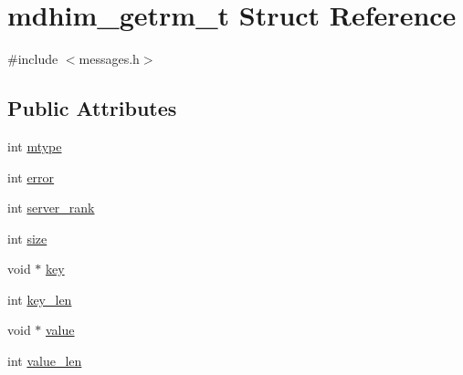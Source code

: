 \hypertarget{structmdhim__getrm__t}{\section{mdhim\-\_\-getrm\-\_\-t Struct Reference}
\label{structmdhim__getrm__t}
}


{\ttfamily \#include $<$messages.\-h$>$}

\subsection*{Public Attributes}
\begin{DoxyCompactItemize}
\item 
int \hyperlink{structmdhim__getrm__t_af7c9cb5700c74dae330d00dcb53306a8}{mtype}
\item 
int \hyperlink{structmdhim__getrm__t_ab5a0bbbc5c249097b7ea3c71a8c59be9}{error}
\item 
int \hyperlink{structmdhim__getrm__t_ab7e6c3fdb4ba044166a37bf1e178b334}{server\-\_\-rank}
\item 
int \hyperlink{structmdhim__getrm__t_a850957632986ef7c1f352de7e126d6a4}{size}
\item 
void $\ast$ \hyperlink{structmdhim__getrm__t_a03ac590954131b0bd04b767115b011d2}{key}
\item 
int \hyperlink{structmdhim__getrm__t_a91f0d874ba5b81f1d22a791f4936653c}{key\-\_\-len}
\item 
void $\ast$ \hyperlink{structmdhim__getrm__t_ae1e2ce047de1164dcdb1bcfe0f6fd0ae}{value}
\item 
int \hyperlink{structmdhim__getrm__t_af5959ca99312966ae31a7ffec962d9ea}{value\-\_\-len}
\end{DoxyCompactItemize}


